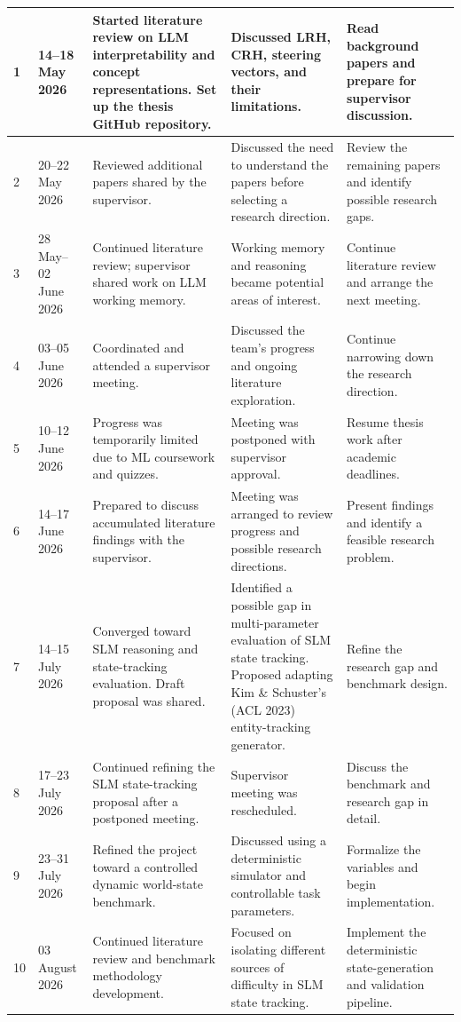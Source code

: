 \documentclass{iutbscthesis}
\begin{document}
\begin{appendices}
\begin{longtable}{@{}p{}p{}p{}p{}p{}@{}}
1 & 14--18 May 2026 & Started literature review on LLM interpretability and concept representations. Set up the thesis GitHub repository. & Discussed LRH, CRH, steering vectors, and their limitations. & Read background papers and prepare for supervisor discussion. \\
\hline
2 & 20--22 May 2026 & Reviewed additional papers shared by the supervisor. & Discussed the need to understand the papers before selecting a research direction. & Review the remaining papers and identify possible research gaps. \\
\hline
3 & 28 May--02 June 2026 & Continued literature review; supervisor shared work on LLM working memory. & Working memory and reasoning became potential areas of interest. & Continue literature review and arrange the next meeting. \\
\hline
4 & 03--05 June 2026 & Coordinated and attended a supervisor meeting. & Discussed the team's progress and ongoing literature exploration. & Continue narrowing down the research direction. \\
\hline
5 & 10--12 June 2026 & Progress was temporarily limited due to ML coursework and quizzes. & Meeting was postponed with supervisor approval. & Resume thesis work after academic deadlines. \\
\hline
6 & 14--17 June 2026 & Prepared to discuss accumulated literature findings with the supervisor. & Meeting was arranged to review progress and possible research directions. & Present findings and identify a feasible research problem. \\
\hline
7 & 14--15 July 2026 & Converged toward SLM reasoning and state-tracking evaluation. Draft proposal was shared. & Identified a possible gap in multi-parameter evaluation of SLM state tracking. Proposed adapting Kim \& Schuster's (ACL 2023) entity-tracking generator. & Refine the research gap and benchmark design. \\
\hline
8 & 17--23 July 2026 & Continued refining the SLM state-tracking proposal after a postponed meeting. & Supervisor meeting was rescheduled. & Discuss the benchmark and research gap in detail. \\
\hline
9 & 23--31 July 2026 & Refined the project toward a controlled dynamic world-state benchmark. & Discussed using a deterministic simulator and controllable task parameters. & Formalize the variables and begin implementation. \\
\hline
10 & 03 August 2026 & Continued literature review and benchmark methodology development. & Focused on isolating different sources of difficulty in SLM state tracking. & Implement the deterministic state-generation and validation pipeline. \\

\end{longtable}
\end{appendices}
\end{document}
